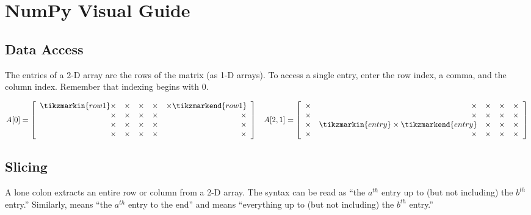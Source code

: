 \newpage

\section*{NumPy Visual Guide}

\subsection*{Data Access}

The entries of a 2-D array are the rows of the matrix (as 1-D arrays).
To access a single entry, enter the row index, a comma, and the column index.
Remember that indexing begins with $0$.

\begin{align*}
A[0] = \left[\begin{array}{rrrrr}
\tikzmarkin{row1}\times & \times & \times & \times & \times\tikzmarkend{row1}\\
\times & \times & \times & \times & \times\\
\times & \times & \times & \times & \times\\
\times & \times & \times & \times & \times\\
\end{array}\right]
&&
A[2,1] = \left[\begin{array}{rrrrr}
\times & \times & \times & \times & \times\\
\times & \times & \times & \times & \times\\
\times & \tikzmarkin{entry} \times \tikzmarkend{entry} & \times & \times & \times\\
\times & \times & \times & \times & \times
\end{array}\right]
\end{align*}

\subsection*{Slicing}

A lone colon extracts an entire row or column from a 2-D array.
The syntax \li{[a:b]} can be read as ``the $a^{th}$ entry up to (but not including) the $b^{th}$ entry.''
Similarly, \li{[a:]} means ``the $a^{th}$ entry to the end'' and \li{[:b]} means ``everything up to (but not including) the $b^{th}$ entry.''


